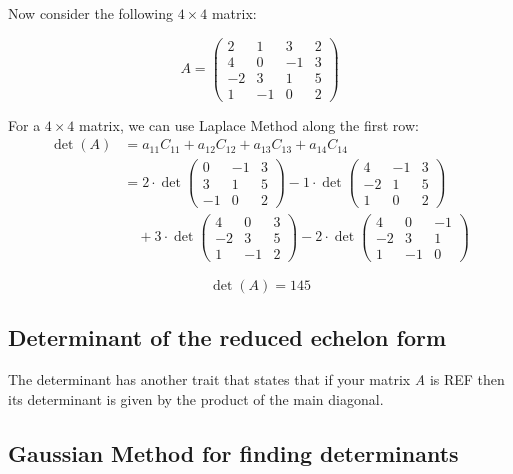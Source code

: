  Now consider the following \(4 \times 4\) matrix:

\begin{equation*}
A = 
\begin{pmatrix}
2 & 1 & 3 & 2 \\
4 & 0 & -1 & 3 \\
-2 & 3 & 1 & 5 \\
1 & -1 & 0 & 2
\end{pmatrix}
\end{equation*}

For a \(4 \times 4\) matrix, we can use Laplace Method along the first row:
\begin{align*}
\det(A) &= a_{11}C_{11} + a_{12}C_{12} + a_{13}C_{13} + a_{14}C_{14} \\
&= 2 \cdot \det\begin{pmatrix} 0 & -1 & 3 \\ 3 & 1 & 5 \\ -1 & 0 & 2 \end{pmatrix} 
- 1 \cdot \det\begin{pmatrix} 4 & -1 & 3 \\ -2 & 1 & 5 \\ 1 & 0 & 2 \end{pmatrix} \\
&\quad + 3 \cdot \det\begin{pmatrix} 4 & 0 & 3 \\ -2 & 3 & 5 \\ 1 & -1 & 2 \end{pmatrix} 
- 2 \cdot \det\begin{pmatrix} 4 & 0 & -1 \\ -2 & 3 & 1 \\ 1 & -1 & 0 \end{pmatrix}
\end{align*}

\[\det(A) = 145\]

\subsection{Determinant of the reduced echelon form}

The determinant has another trait that states that if your matrix \emph{A} is REF then
its determinant is given by the product of the main diagonal. 

\subsection{Gaussian Method for finding determinants}

